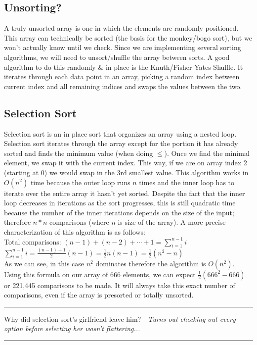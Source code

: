 \documentclass[letterpaper, 10pt]{article}
\begin{document}
\subsection{Unsorting?}
A truly unsorted array is one in which the elements are randomly positioned. This array can technically be sorted (the basis for the monkey/bogo sort), but we won't actually know until we check. Since we are implementing several sorting algorithms, we will need to unsort/shuffle the array between sorts. A good algorithm to do this randomly \& in place is the Knuth/Fisher Yates Shuffle. It iterates through each data point in an array, picking a random index between current index and all remaining indices and swaps the values between the two.

\subsection{Selection Sort}
Selection sort is an in place sort that organizes an array using a nested loop. Selection sort iterates through the array except for the portion it has already sorted and finds the minimum value (when doing $\leq$). Once we find the minimal element, we swap it with the current index. This way, if we are on array index 2 (starting at 0) we would swap in the 3rd smallest value. This algorithm works in $O(n^2)$ time because the outer loop runs $n$ times and the inner loop has to iterate over the entire array it hasn't yet sorted. Despite the fact that the inner loop decreases in iterations as the sort progresses, this is still quadratic time because the number of the inner iterations depends on the size of the input; therefore $n*n$ comparisons (where $n$ is size of the array). A more precise characterization of this algorithm is as follows: \\
Total comparisons: $(n - 1) + (n - 2) + \cdots + 1 = \sum_{i=1}^{n-1} i$ \\
$\sum_{i=1}^{n-1} i = \frac{(n-1)+1}{2}(n-1) = \frac{1}{2}n(n-1) = \frac{1}{2}(n^2-n)$ \\
As we can see, in this case $n^2$ dominates therefore the algorithm is $O(n^2)$. Using this formula on our array of 666 elements, we can expect $\frac{1}{2}(666^2-666)$ or 221,445 comparisons to be made. It will always take this exact number of comparisons, even if the array is presorted or totally unsorted. 

\hrule
\vspace{.25cm}
Why did selection sort's girlfriend leave him? - \textit{Turns out checking out every option before selecting her wasn't flattering...}\\
\hrule
\end{document}

